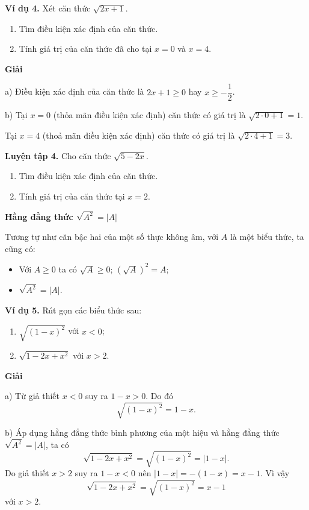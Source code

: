 \begin{lesson}
    \textbf{Ví dụ 4.} Xét căn thức $\sqrt{2x+1}$.
    \begin{enumerate}[label=\alph*)]
        \item Tìm điều kiện xác định của căn thức.
        \item Tính giá trị của căn thức đã cho tại $x=0$ và $x=4$.
    \end{enumerate}

    \textbf{Giải}

    a) Điều kiện xác định của căn thức là $2x+1\ge0$ hay $x\ge-\dfrac{1}{2}$.

    b) Tại $x=0$ (thỏa mãn điều kiện xác định) căn thức có giá trị là $\sqrt{2\cdot0+1}=1$.

    Tại $x=4$ (thoả mãn điều kiện xác định) căn thức có giá trị là $\sqrt{2\cdot4+1}=3$.

    \textbf{Luyện tập 4.} Cho căn thức $\sqrt{5-2x}$.
    \begin{enumerate}[label=\alph*)]
        \item Tìm điều kiện xác định của căn thức.
        \item Tính giá trị của căn thức tại $x=2$.
    \end{enumerate}

    \answerline
    \answerline

    \textbf{Hằng đẳng thức $\sqrt{A^2}=|A|$}

    Tương tự như căn bậc hai của một số thực không âm, với $A$ là một biểu thức, ta cũng có:
    \begin{itemize}
        \item Với $A\ge0$ ta có $\sqrt{A}\ge0$; $(\sqrt{A})^2=A$;
        \item $\sqrt{A^2}=|A|$.
    \end{itemize}

    \textbf{Ví dụ 5.} Rút gọn các biểu thức sau:
    \begin{enumerate}[label=\alph*)]
        \item $\sqrt{(1-x)^2}$ với $x<0$;
        \item $\sqrt{1-2x+x^2}$ với $x>2$.
    \end{enumerate}

    \textbf{Giải}

    a) Từ giả thiết $x<0$ suy ra $1-x>0$. Do đó
    \[
        \sqrt{(1-x)^2}=1-x.
    \]

    b) Áp dụng hằng đẳng thức bình phương của một hiệu và hằng đẳng thức $\sqrt{A^2}=|A|$, ta có
    \[
        \sqrt{1-2x+x^2}=\sqrt{(1-x)^2}=|1-x|.
    \]
    Do giả thiết $x>2$ suy ra $1-x<0$ nên $|1-x|=-(1-x)=x-1$. Vì vậy
    \[
        \sqrt{1-2x+x^2}=\sqrt{(1-x)^2}=x-1
    \]
    với $x>2$.


\end{lesson}
